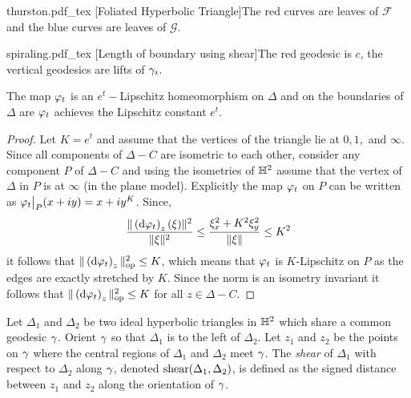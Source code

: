   \begin{minipage}{0.45\textwidth}
  \centering
  \def\svgwidth{0.8\textwidth}
  {thurston.pdf_tex}
  [Foliated Hyperbolic Triangle]{The red curves are leaves of $ \mathscr{F}$ and the blue curves are leaves of $ \mathscr{G}$.}
  \label{fig:triangle}
  \end{minipage}
\hfill
\begin{minipage}{0.45\textwidth}
   \centering
   \tiny
   \def\svgwidth{\textwidth}
   {spiraling.pdf_tex}
   [Length of boundary using shear]{The red geodesic is $c$, the vertical geodesics are lifts of $\gamma_i$.}
   \label{fig:spiraling}
\end{minipage}
\begin{proposition}
  The map $\varphi_t$ is an $e^t-$Lipschitz homeomorphism on $\Delta$ and on the boundaries of $\Delta$ are $\varphi_t$ achieves the Lipschitz constant $e^t$.
\end{proposition} 
\begin{proof}
  Let $K= e^t$ and assume that the vertices of the triangle lie at $0,1,$ and $\infty$. Since all components of $\Delta - C$ are isometric to each other, consider any component $P$ of $\Delta - C$ and using the isometries of $\mathbb{H}^2$ assume that the vertex of $\Delta$ in $P$ is at $\infty$ (in the plane model). Explicitly the map $\varphi_t$ on $P$ can be written as $\varphi_t\big|_P(x+iy) = x + iy^{K}$. Since,
  \begin{align*}
    \frac{\|\left(\text{d} \varphi_t\right)_z(\xi)\|^2}{\|\xi\|^2} \leq \frac{\xi_x^2 + K^2\xi_y^2}{\|\xi\|} \leq K^2
  \end{align*}
  it follows that $\| \left(\text{d} \varphi_t\right)_z\|^2_{\text{op}}\leq K$, which means that $\varphi_t$ is $K$-Lipschitz on $P$ as the edges are exactly stretched by $K$. Since the norm is an isometry invariant it follows that $\| \left(\text{d} \varphi_t\right)_z\|^2_{\text{op}} \leq K$ for all $z\in \Delta - C$.
\end{proof}
\begin{definition}
  Let $\Delta_1$ and $\Delta_2$ be two ideal hyperbolic triangles in $\mathbb{H}^2$ which share a common geodesic $\gamma$. Orient $\gamma$ so that $\Delta_1$ is to the left of $\Delta_2$. Let $z_1$ and $z_2$ be the points on $\gamma$ where the central regions of $\Delta_1$ and $\Delta_2$ meet $\gamma$. The \textit{shear} of $\Delta_1$ with respect to $\Delta_2$ along $\gamma$, denoted $\text{shear}(\Delta_1, \Delta_2)$, is defined as the signed distance between $z_1$ and $z_2$ along the orientation of $\gamma$. 
\end{definition}
